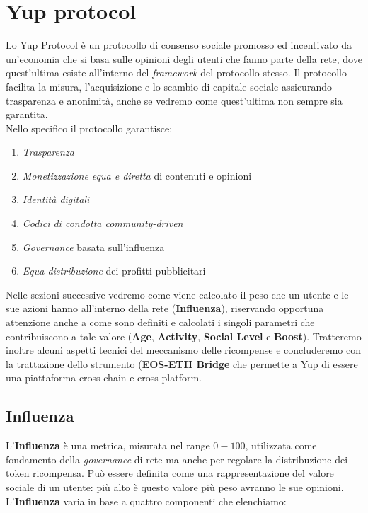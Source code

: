 \section{Yup protocol}
Lo Yup Protocol è un protocollo di consenso sociale promosso ed incentivato da un'economia che si basa sulle opinioni degli utenti che fanno parte della rete, dove quest'ultima esiste all'interno del \textit{framework} del protocollo stesso.
Il protocollo facilita la misura, l'acquisizione e lo scambio di capitale sociale assicurando trasparenza e anonimità, anche se vedremo come quest'ultima non sempre sia garantita.
\\
Nello specifico il protocollo garantisce:
\begin{enumerate}
    \item \textit{Trasparenza}
    \item \textit{Monetizzazione equa e diretta} di contenuti e opinioni
    \item \textit{Identità digitali}
    \item \textit{Codici di condotta community-driven}
    \item \textit{Governance} basata sull'influenza
    \item \textit{Equa distribuzione} dei profitti pubblicitari
\end{enumerate}

Nelle sezioni successive vedremo come viene calcolato il peso che un utente e le sue azioni hanno all'interno della rete (\textbf{Influenza}), riservando opportuna attenzione anche a come sono definiti e calcolati i singoli parametri che contribuiscono a tale valore (\textbf{Age}, \textbf{Activity}, \textbf{Social Level} e \textbf{Boost}). Tratteremo inoltre alcuni aspetti tecnici del meccanismo delle ricompense e concluderemo con la trattazione dello strumento (\textbf{EOS-ETH Bridge} che permette a Yup di essere una piattaforma cross-chain e cross-platform.

\subsection{Influenza}
L'\textbf{Influenza} è una metrica, misurata nel range $0-100$, utilizzata come fondamento della \textit{governance} di rete ma anche per regolare la distribuzione dei token ricompensa.
Può essere definita come una rappresentazione del valore sociale di un utente: più alto è questo valore più peso avranno le sue opinioni. L'\textbf{Influenza} varia in base a quattro componenti che elenchiamo:

